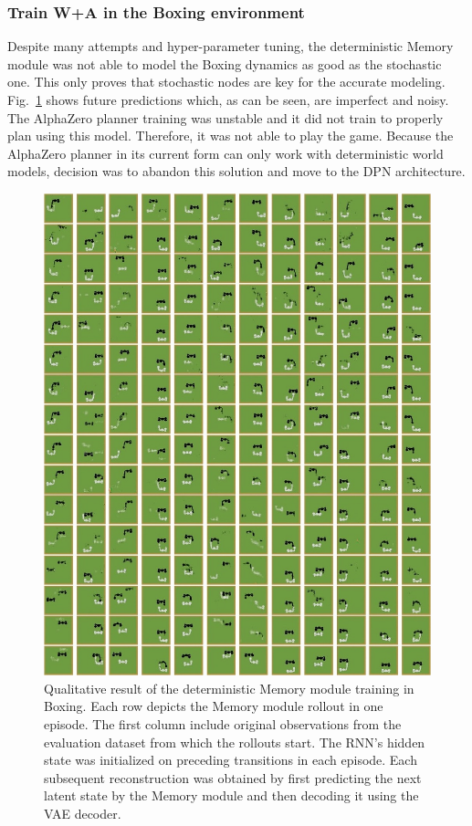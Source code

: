 \subsubsection{Train W+A in the Boxing environment}

Despite many attempts and hyper-parameter tuning, the deterministic Memory module was not able to model the Boxing dynamics as good as the stochastic one. This only proves that stochastic nodes are key for the accurate modeling. Fig.~\ref{Fig.WM_Boxing_deterministic_memory} shows future predictions which, as can be seen, are imperfect and noisy. The AlphaZero planner training was unstable and it did not train to properly plan using this model. Therefore, it was not able to play the game. Because the AlphaZero planner in its current form can only work with deterministic world models, decision was to abandon this solution and move to the DPN architecture.

\begin{figure}[H]
\includegraphics[width=1\textwidth,keepaspectratio]{figures/Boxing_deterministic_memory.JPG}
\caption[Qualitative result of the World Models' deterministic Memory module training in Boxing]{Qualitative result of the deterministic Memory module training in Boxing. Each row depicts the Memory module rollout in one episode. The first column include original observations from the evaluation dataset from which the rollouts start. The RNN's hidden state was initialized on preceding transitions in each episode. Each subsequent reconstruction was obtained by first predicting the next latent state by the Memory module and then decoding it using the VAE decoder.}
\label{Fig.WM_Boxing_deterministic_memory}
\end{figure}

